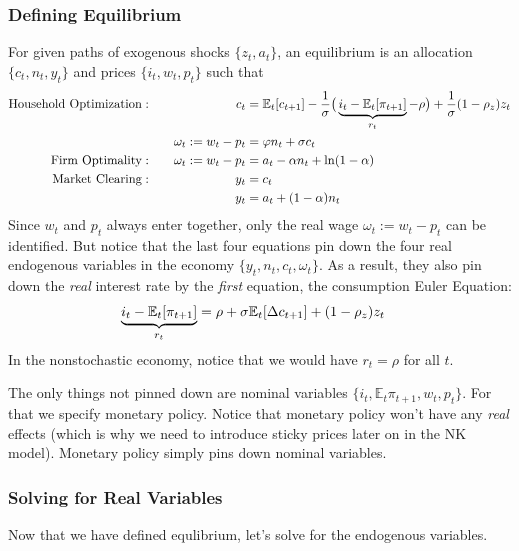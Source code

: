 \documentclass[12pt]{article}
\theoremstyle{plain}
\theoremstyle{definition}
\theoremstyle{remark}
\newcommand{\E}{\mathbb{E}}
\begin{document}
\subsubsection{Defining Equilibrium}

For given paths of exogenous shocks $\{z_t,a_t\}$, an equilibrium is an
allocation $\{c_t,n_t,y_t\}$ and prices $\{i_t,w_t,p_t\}$ such that
\begin{alignat*}{3}
  \text{Household Optimization}:&&
  \qquad\qquad
      c_{t}
      &=
      \E_t[c_{t+1}]
      -
      \frac{1}{\sigma}
      \big(
      \underbrace{%
      i_t-\E_t[\pi_{t+1}]
      }_{r_t}
      -\rho
      \big)
      +
      \frac{1}{\sigma}
      (1-\rho_z) z_t
      \\
      &&
      \omega_t:=
      w_t - p_t
      &=
      \varphi n_t
      + \sigma c_t
      \\
  \text{Firm Optimality}:&&\quad
      \omega_t:=w_t - p_t &= a_t - \alpha n_t + \ln(1-\alpha)
      \\
  \text{Market Clearing}:&&
    y_t &= c_t \\
    && y_t &= a_t + (1-\alpha)n_t
\end{alignat*}
Since $w_t$ and $p_t$ always enter together, only the real wage
$\omega_t:=w_t-p_t$ can be identified. But notice that the last four
equations pin down the four real endogenous variables in the economy
$\{y_t,n_t,c_t,\omega_t\}$. As a result, they also pin down the
\emph{real} interest rate by the \emph{first} equation, the consumption
Euler Equation:
\begin{align*}
    \underbrace{%
    i_t-\E_t[\pi_{t+1}]
    }_{r_t}
    &=
    \rho
    + \sigma \E_t[\Delta c_{t+1}]
    + (1-\rho_z) z_t
\end{align*}
In the nonstochastic economy, notice that we would have $r_t=\rho$ for
all $t$.

The only things not pinned down are nominal variables
$\{i_t,\E_t\pi_{t+1},w_t,p_t\}$. For that we specify monetary policy.
Notice that monetary policy won't have any \emph{real} effects (which is
why we need to introduce sticky prices later on in the NK model).
Monetary policy simply pins down nominal variables.

\clearpage
\subsubsection{Solving for Real Variables}

Now that we have defined equlibrium, let's solve for the endogenous
variables.
\end{document}
